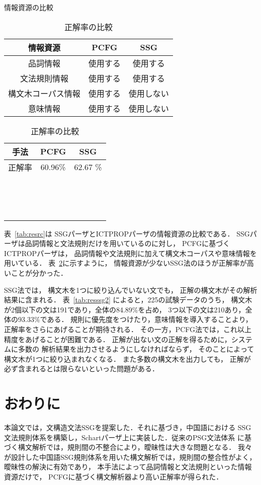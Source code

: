 \documentclass[japanese]{jnlp_1.3a}
\begin{document}
\begin{table}[b]\centering
\begin{minipage}{200pt}
  \caption{情報資源の比較}
  \begin{tabular}{|c|c|c|} \hline
情報資源&PCFG&SSG\\\hline
品詞情報  &使用する  & 使用する \\
 文法規則情報 &使用する   & 使用する  \\
 構文木コーパス情報  & 使用する  &  使用しない \\
 意味情報 & 使用する  & 使用しない  \\\hline
  \end{tabular}
  \label{tab:resrc}
\end{minipage}
\hfill
\begin{minipage}{200pt}
 \centering
  \caption{正解率の比較}
  \begin{tabular}{|c|c|c|} \hline
手法&PCFG&SSG\\\hline
正解率 & 60.96\%  &62.67 \%  \\
\hline
\multicolumn{3}{c}{　}\\\multicolumn{3}{c}{　}\\\multicolumn{3}{c}{　}
  \end{tabular}
  \label{tab:resfinal}
\end{minipage}
\end{table}

表~\ref{tab:resrc}は
SSGパーザとICTPROPパーザの情報資源の比較である．
SSGパーザは品詞情報と文法規則だけを用いているのに対し，
PCFGに基づくICTPROPパーザは，
品詞情報や文法規則に加えて構文木コーパスや意味情報を用いている．
表~\ref{tab:resfinal}に示すように，
情報資源が少ないSSG法のほうが正解率が高いことが分かった．

SSG法では，
構文木を1つに絞り込んでいない文でも，
正解の構文木がその解析結果に含まれる．
表~\ref{tab:resssg2}
によると，225の試験データのうち，
構文木が2個以下の文は191であり，全体の84.89\%を占め，
3つ以下の文は210あり，全体の93.33\%である．
規則に優先度をつけたり，意味情報を導入することより，
正解率をさらにあげることが期待される．
その一方，PCFG法では，これ以上精度をあげることが困難である．
正解が出ない文の正解を得るために，システムに多数の
解析結果を出力させるようにしなければならず，
そのことによって構文木が1つに絞り込まれなくなる．
また多数の構文木を出力しても，
正解が必ず含まれるとは限らないといった問題がある．



\section{おわりに}
本論文では，文構造文法SSGを提案した．それに基づき，中国語における
SSG文法規則体系を構築し，Schartパーザ上に実装した．従来のPSG文法体系
に基づく構文解析では，規則間の不整合により，曖昧性は大きな問題となる．
我々が設計した中国語SSG規則体系を用いた構文解析では，規則間の整合性がよく，
曖昧性の解決に有効であり，
本手法によって品詞情報と文法規則といった情報資源だけで，
PCFGに基づく構文解析器より高い正解率が得られた．
\end{document}
